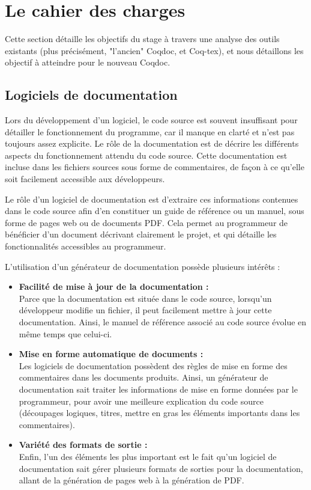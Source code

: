 \documentclass[a4paper, 11pt]{report}
\begin{document}
  \section{Le cahier des charges}
  Cette section détaille les objectifs du stage à travers une analyse des outils
  existants (plus précisément, "l'ancien" Coqdoc, et Coq-tex),
  et nous détaillons les objectif à atteindre pour le nouveau Coqdoc.
    \subsection{Logiciels de documentation}
    Lors du développement d'un logiciel, le code source est souvent insuffisant
    pour détailler le fonctionnement du programme, car il manque en clarté et
    n'est pas toujours assez explicite.
    Le rôle de la documentation est de décrire les différents aspects du
    fonctionnement attendu du code source. Cette documentation est incluse
    dans les fichiers sources sous forme de commentaires, de façon à ce
    qu'elle soit facilement accessible aux développeurs.

    Le rôle d'un logiciel de documentation est d'extraire ces informations
    contenues dans le code source afin d'en constituer un guide de référence
    ou un manuel, sous forme de pages web ou de documents PDF.
    Cela permet au programmeur de bénéficier d'un document décrivant clairement
    le projet, et qui détaille les fonctionnalités accessibles au programmeur.

    L'utilisation d'un générateur de documentation possède plusieurs intérêts :
    \begin{itemize}
      \item \textbf{Facilité de mise à jour de la documentation :} \\
        Parce que la documentation est située dans le code source, lorsqu'un
        développeur modifie un fichier, il peut facilement mettre à jour cette
        documentation. Ainsi, le manuel de référence associé au code source
        évolue en même temps que celui-ci.
      \item \textbf{Mise en forme automatique de documents :} \\
        Les logiciels de documentation possèdent des règles de mise en forme
        des commentaires dans les documents produits. Ainsi, un générateur
        de documentation sait traiter les informations de mise en forme
        données par le programmeur, pour avoir une meilleure explication du
        code source (découpages logiques, titres, mettre en gras les éléments
        importants dans les commentaires).
      \item \textbf{Variété des formats de sortie :} \\
        Enfin, l'un des éléments les plus important est le fait qu'un logiciel
        de documentation sait gérer plusieurs formats de sorties pour la
        documentation, allant de la génération de pages web à la génération de
        PDF.
    \end{itemize}
\end{document}

